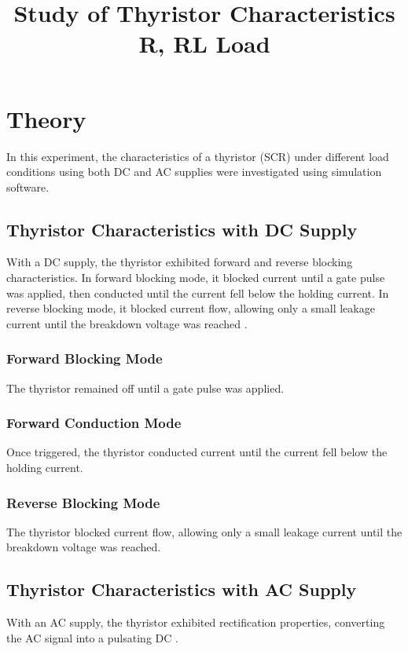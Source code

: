 \documentclass[12pt]{article}
\title{Study of Thyristor Characteristics R, RL Load}
\author{}
\date{}
\begin{document}


\pagebreak

\tableofcontents

\pagebreak
{}
\maketitle

\section*{Theory}
In this experiment, the characteristics of a thyristor (SCR) under different load conditions using both DC and AC supplies were investigated using simulation software.

\subsection*{Thyristor Characteristics with DC Supply}
With a DC supply, the thyristor exhibited forward and reverse blocking characteristics. In forward blocking mode, it blocked current until a gate pulse was applied, then conducted until the current fell below the holding current. In reverse blocking mode, it blocked current flow, allowing only a small leakage current until the breakdown voltage was reached \cite{thyristor_characteristics}.

\subsubsection*{Forward Blocking Mode}
The thyristor remained off until a gate pulse was applied.

\subsubsection*{Forward Conduction Mode}
Once triggered, the thyristor conducted current until the current fell below the holding current.

\subsubsection*{Reverse Blocking Mode}
The thyristor blocked current flow, allowing only a small leakage current until the breakdown voltage was reached.

\subsection*{Thyristor Characteristics with AC Supply}
With an AC supply, the thyristor exhibited rectification properties, converting the AC signal into a pulsating DC \cite{ac_supply}.
\end{document}
